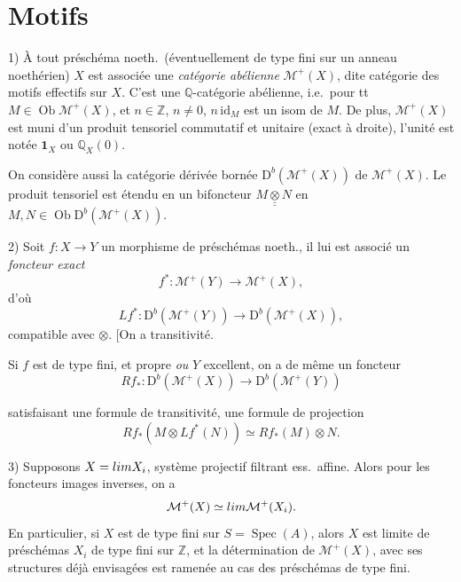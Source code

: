 \documentclass[11pt,a4paper]{article}
\begin{document}
\section{Motifs}

1) À tout préschéma noeth.\ (éventuellement de type fini sur un anneau
noethérien) $X$ est associée une \emph{catégorie abélienne}
$\mathcal{M}^{+}(X)$, dite catégorie des motifs effectifs sur $X$. C'est une
$\mathbb{Q}$-catégorie  abélienne, i.e.\ pour
tt $M \in \operatorname{Ob} \mathcal{M}^{+}(X)$, et $n \in \mathbb{Z}$,
$n \neq 0$, $n\, \mathrm{id}_{M}$ est un isom de $M$. De plus,
$\mathcal{M}^{+}(X)$ est muni d'un produit tensoriel commutatif et unitaire
(exact à droite), l'unité est notée $\mathbf{1}_{X}$ ou $\mathbb{Q}_{X}(0)$.

On considère aussi la catégorie dérivée bornée $\mathrm{D}^{b}(\mathcal{M}^{+}(X))$
de $\mathcal{M}^{+}(X)$. Le produit tensoriel est étendu en un bifoncteur
$M \mathbin{\underline{\underline{\otimes}}} N$ en $M, N \in \operatorname{Ob} \mathrm{D}^{b}(\mathcal{M}^{+}(X))$.

2) Soit $f : X \to Y$ un morphisme de préschémas \struck{\ill{}} noeth., il
lui est associé un \emph{foncteur exact}
\[
  f^{*} : \mathcal{M}^{+}(Y) \to \mathcal{M}^{+}(X),
\]
d'où
\[
  Lf^{*} : \mathrm{D}^{b}(\mathcal{M}^{+}(Y)) \to \mathrm{D}^{b}(\mathcal{M}^{+}(X)),
\]
compatible avec $\otimes$. [On a transitivité.

Si $f$ est de type fini, et propre \emph{ou} $Y$ excellent, on a
 de même un foncteur
\[
  Rf_{*} : \mathrm{D}^{b}(\mathcal{M}^{+}(X)) \to \mathrm{D}^{b}(\mathcal{M}^{+}(Y))
\]

satisfaisant une formule de transitivité, une formule de projection
\[
  Rf_{*}(M \otimes Lf^{*}(N)) \simeq Rf_{*}(M) \otimes N .
\]

3) Supposons $X = \varprojlim X_{i}$, système projectif filtrant ess.\ affine.
Alors pour les foncteurs images inverses, on a
\[
  \mathcal{M}^{+}(X) \simeq \varinjlim \mathcal{M}^{+}(X_{i}) .
\]
En particulier, si $X$ est de type fini sur $S = \operatorname{Spec}(A)$,
alors $X$ est limite de préschémas $X_{i}$ de type fini sur $\mathbb{Z}$, et
la détermination de $\mathcal{M}^{+}(X)$, avec ses structures déjà envisagées
est  ramenée au cas des préschémas de type fini.
\end{document}
